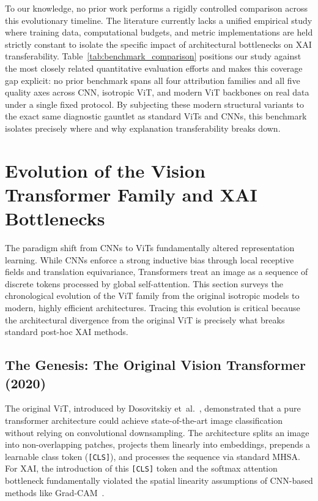 \documentclass[final,5p,times,twocolumn]{elsarticle}
\begin{document}
To our knowledge, no prior work performs a rigidly controlled comparison across this evolutionary timeline. The literature currently lacks a unified empirical study where training data, computational budgets, and metric implementations are held strictly constant to isolate the specific impact of architectural bottlenecks on XAI transferability. Table~\ref{tab:benchmark_comparison} positions our study against the most closely related quantitative evaluation efforts and makes this coverage gap explicit: no prior benchmark spans all four attribution families and all five quality axes across CNN, isotropic ViT, and modern ViT backbones on real data under a single fixed protocol. By subjecting these modern structural variants to the exact same diagnostic gauntlet as standard ViTs and CNNs, this benchmark isolates precisely where and why explanation transferability breaks down.

\section{Evolution of the Vision Transformer Family and XAI Bottlenecks}
\label{sec:vit_evolution}

The paradigm shift from CNNs to ViTs fundamentally altered representation learning. While CNNs enforce a strong inductive bias through local receptive fields and translation equivariance, Transformers treat an image as a sequence of discrete tokens processed by global self-attention. This section surveys the chronological evolution of the ViT family from the original isotropic models to modern, highly efficient architectures. Tracing this evolution is critical because the architectural divergence from the original ViT is precisely what breaks standard post-hoc XAI methods.

\subsection{The Genesis: The Original Vision Transformer (2020)}
The original ViT, introduced by Dosovitskiy et~al.~\cite{dosovitskiy2021vit}, demonstrated that a pure transformer architecture could achieve state-of-the-art image classification without relying on convolutional downsampling. The architecture splits an image into non-overlapping patches, projects them linearly into embeddings, prepends a learnable class token (\texttt{[CLS]}), and processes the sequence via standard MHSA. For XAI, the introduction of this \texttt{[CLS]} token and the softmax attention bottleneck fundamentally violated the spatial linearity assumptions of CNN-based methods like Grad-CAM~\cite{chefer2021transformer}.
\end{document}
